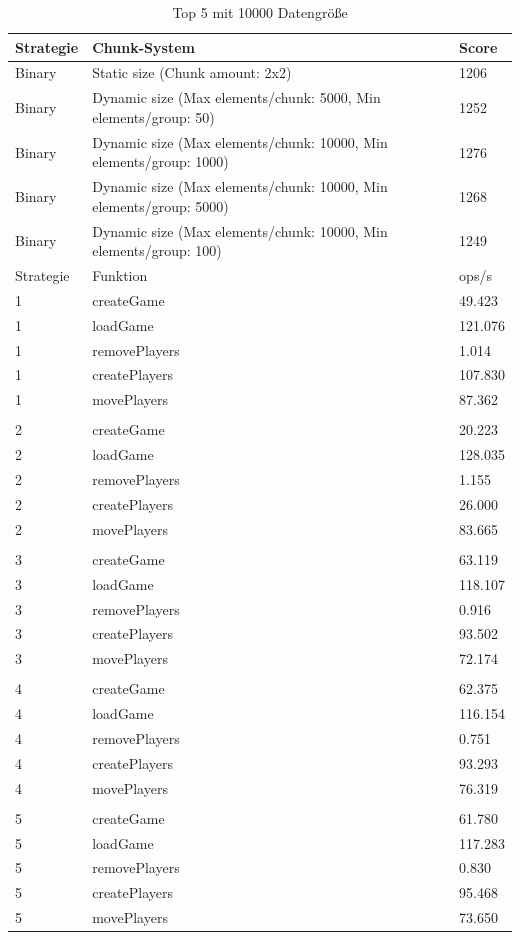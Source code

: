 \begin{table}[htp]
    \centering
    \caption{Top 5 mit 10000 Datengröße}
    \begin{tabular}{|l|l|l|}
    \hline
        Strategie & Chunk-System & Score \\
        \hline
        Binary & Static size (Chunk amount: 2x2) & 1206\\
        Binary & Dynamic size (Max elements/chunk: 5000, Min elements/group: 50) & 1252\\
        Binary & Dynamic size (Max elements/chunk: 10000, Min elements/group: 1000) & 1276\\
        Binary & Dynamic size (Max elements/chunk: 10000, Min elements/group: 5000) & 1268\\
        Binary & Dynamic size (Max elements/chunk: 10000, Min elements/group: 100) & 1249\\
        \hline
        Strategie & Funktion & ops/s \\
        \hline
        1 & createGame & 49.423\\
        1 & loadGame & 121.076\\
        1 & removePlayers & 1.014\\
        1 & createPlayers & 107.830\\
        1 & movePlayers & 87.362\\
        & & \\
        2 & createGame & 20.223\\
        2 & loadGame & 128.035\\
        2 & removePlayers & 1.155\\
        2 & createPlayers & 26.000\\
        2 & movePlayers & 83.665\\
        & & \\
        3 & createGame & 63.119\\
        3 & loadGame & 118.107\\
        3 & removePlayers & 0.916\\
        3 & createPlayers & 93.502\\
        3 & movePlayers & 72.174\\
        & & \\
        4 & createGame & 62.375\\
        4 & loadGame & 116.154\\
        4 & removePlayers & 0.751\\
        4 & createPlayers & 93.293\\
        4 & movePlayers & 76.319\\
        & & \\
        5 & createGame & 61.780\\
        5 & loadGame & 117.283\\
        5 & removePlayers & 0.830\\
        5 & createPlayers & 95.468\\
        5 & movePlayers & 73.650\\
        \hline
    \end{tabular}
    \label{tbl:middleDataCount}
\end{table}

